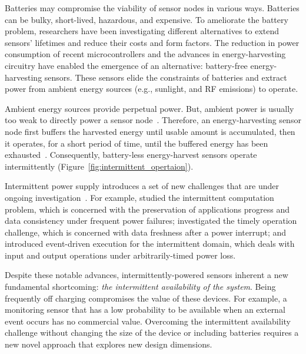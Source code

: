 Batteries may compromise the viability of sensor nodes in various ways. Batteries can be bulky, short-lived, hazardous, and expensive. To ameliorate the battery problem, researchers have been investigating different alternatives to extend sensors’ lifetimes and reduce their costs and form factors.  
The reduction in power consumption of recent microcontrollers and the advances in energy-harvesting circuitry have enabled the emergence of an alternative: battery-free energy-harvesting sensors. 
These sensors elide the constraints of batteries and extract power from ambient energy sources (e.g., sunlight, and RF emissions) to operate. 

Ambient energy sources provide perpetual power. But, ambient power is usually too weak to directly power a sensor node~\cite{liu2013ambient}.  Therefore, an energy-harvesting sensor node first buffers the harvested energy until usable amount is accumulated, then it operates, for a short period of time, until the buffered energy has been exhausted~\cite{lucia2017intermittent}.  Consequently, battery-less energy-harvest sensors operate intermittently (Figure~\ref{fig:intermittent_opertaion}).

Intermittent power supply introduces a set of new challenges that are under ongoing investigation~\cite{lucia2017intermittent}.
For example, \cite{lucia2017intermittent,mementos,dino,colin2016chain,balsamo2015hibernus} studied the intermittent computation problem, which is concerned with the preservation of applications progress and data consistency under frequent power failures; \citet{hester2017timely} investigated the timely operation challenge, which is concerned with data freshness after a power interrupt; 
and \citet{yildirim2018ink} introduced event-driven execution for the intermittent domain, which deals with input and output operations under arbitrarily-timed power loss.

Despite these notable advances, intermittently-powered sensors inherent a new fundamental shortcoming: \textit{the intermittent availability of the system}. Being frequently off charging compromises the value of these devices. For example, a monitoring sensor that has a low probability to be available when an external event occurs has no commercial value. 
Overcoming the intermittent availability challenge without changing the size of the device or including batteries requires a new novel approach that explores new design dimensions. 

